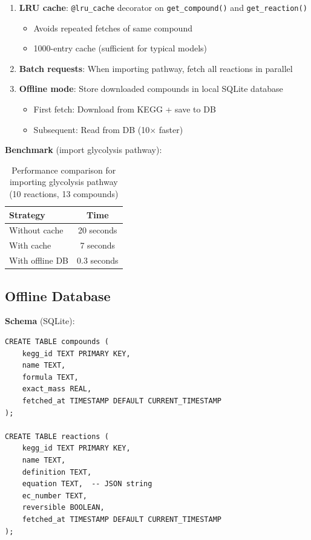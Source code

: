 \begin{enumerate}
    \item \textbf{LRU cache}: \texttt{@lru\_cache} decorator on \texttt{get\_compound()} and \texttt{get\_reaction()}
    \begin{itemize}
        \item Avoids repeated fetches of same compound
        \item 1000-entry cache (sufficient for typical models)
    \end{itemize}
    
    \item \textbf{Batch requests}: When importing pathway, fetch all reactions in parallel
    
    \item \textbf{Offline mode}: Store downloaded compounds in local SQLite database
    \begin{itemize}
        \item First fetch: Download from KEGG + save to DB
        \item Subsequent: Read from DB (10$\times$ faster)
    \end{itemize}
\end{enumerate}

\textbf{Benchmark} (import glycolysis pathway):

\begin{table}[h]
\centering
\begin{tabular}{@{}lc@{}}
\toprule
\textbf{Strategy} & \textbf{Time} \\
\midrule
Without cache & 20 seconds \\
With cache & 7 seconds \\
With offline DB & 0.3 seconds \\
\bottomrule
\end{tabular}
\caption{Performance comparison for importing glycolysis pathway (10 reactions, 13 compounds)}
\label{tab:kegg-performance}
\end{table}

\subsection{Offline Database}
\label{subsec:kegg-offline-database}

\textbf{Schema} (SQLite):

\begin{verbatim}
CREATE TABLE compounds (
    kegg_id TEXT PRIMARY KEY,
    name TEXT,
    formula TEXT,
    exact_mass REAL,
    fetched_at TIMESTAMP DEFAULT CURRENT_TIMESTAMP
);

CREATE TABLE reactions (
    kegg_id TEXT PRIMARY KEY,
    name TEXT,
    definition TEXT,
    equation TEXT,  -- JSON string
    ec_number TEXT,
    reversible BOOLEAN,
    fetched_at TIMESTAMP DEFAULT CURRENT_TIMESTAMP
);
\end{verbatim}

